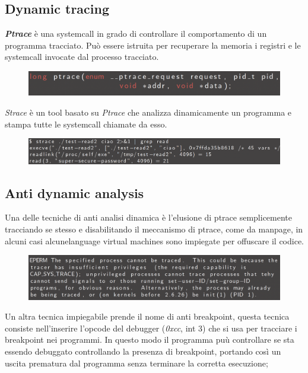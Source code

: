 \subsection{Dynamic tracing}
\textit{\textbf{Ptrace}} è una systemcall in grado di controllare il comportamento di un programma tracciato. Può essere istruita per recuperare la memoria i registri e le systemcall invocate dal processo tracciato.
\begin{figure}[h!]
    \centering
    \includegraphics[width=.5\linewidth]{res/ptrace_header.png}
    \caption{}
\end{figure}
\textit{Strace} è un tool basato su \textit{Ptrace} che analizza dinamicamente un programma e stampa tutte le systemcall chiamate da esso.

\begin{figure}[h!]
    \centering
    \includegraphics[width=.5\linewidth]{res/strace.png}
    \caption{}
\end{figure}

\subsection{Anti dynamic analysis}

Una delle tecniche di anti analisi dinamica è l'elusione di ptrace semplicemente tracciando se stesso e disabilitando il meccanismo di ptrace, come da manpage, in alcuni casi alcunelanguage virtual machines sono impiegate per offuscare il codice.

\begin{figure}[h!]
    \centering
    \includegraphics[width=.5\linewidth]{res/anti_analysis_ptrace.png}
    \caption{}
\end{figure}

Un altra tecnica impiegabile prende il nome di anti breakpoint, questa tecnica consiste nell'inserire l'opcode del debugger (\textit{0xcc}, int 3) che si usa per tracciare i breakpoint nei programmi.
In questo modo il programma puù controllare se sta essendo debuggato controllando la presenza di breakpoint, portando così un uscita prematura dal programma senza terminare la corretta esecuzione;

